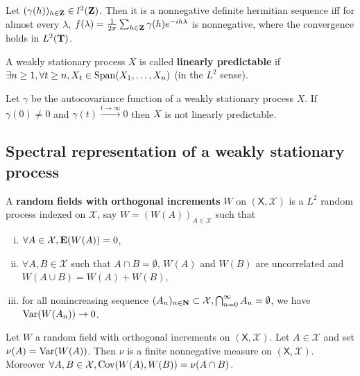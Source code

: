 	\begin{cor}
		Let $(\gamma(h))_{h \in \mathbf{Z}} \in l^2(\mathbf{Z})$.
		Then it is a nonnegative definite hermitian sequence iff for almost every $\lambda$, $f(\lambda) = \frac{1}{2\pi} \sum_{h \in \mathbf{Z}} \gamma(h) e^{-ih \lambda}$ is nonnegative, where the convergence holds in $L^2(\mathbf{T})$.
	\end{cor}

	\begin{defn}
		A weakly stationary process $X$ is called \textbf{linearly predictable} if $\exists n \geq 1, \forall t \geq n, X_t \in \operatorname{Span}(X_1,\ldots,X_n)$ (in the $L^2$ sense).
	\end{defn}

	\begin{pop}
		Let $\gamma$ be the autocovariance function of a weakly stationary process $X$.
		If $\gamma(0) \neq 0$ and $\gamma(t) \overset{t \to \infty}{\to} 0$ then $X$ is not linearly predictable.
	\end{pop}

\subsection{Spectral representation of a weakly stationary process}

	\begin{defn}
		A \textbf{random fields with orthogonal increments} $W$ on $(\mathsf{X},\mathcal{X})$ is a $L^2$ random process indexed on $\mathcal{X}$, say $W = (W(A))_{A \in \mathcal{X}}$ such that
		\begin{enumerate}[(i)]
			\item $\forall A \in \mathcal{X}, \mathbf{E}(W(A)) = 0$,
			\item $\forall A,B \in \mathcal{X}$ such that $A \cap B = \emptyset$, $W(A)$ and $W(B)$ are uncorrelated and $W(A \cup B) = W(A) + W(B)$,
			\item for all nonincreasing sequence $(A_n)_{n \in \mathbf{N}} \subset \mathcal{X}, \bigcap_{n = 0}^\infty A_n = \emptyset$, we have $\operatorname{Var}(W(A_n)) \to 0$.
		\end{enumerate}
	\end{defn}

	\begin{lem}
		Let $W$ a random field with orthogonal increments on $(\mathsf{X},\mathcal{X})$.
		Let $A \in \mathcal{X}$ and set $\nu(A) = \operatorname{Var}(W(A))$.
		Then $\nu$ is a finite nonnegative measure on $(\mathsf{X},\mathcal{X})$.
		Moreover $\forall A, B \in \mathcal{X}, \operatorname{Cov}(W(A),W(B)) = \nu(A \cap B)$.
	\end{lem}

